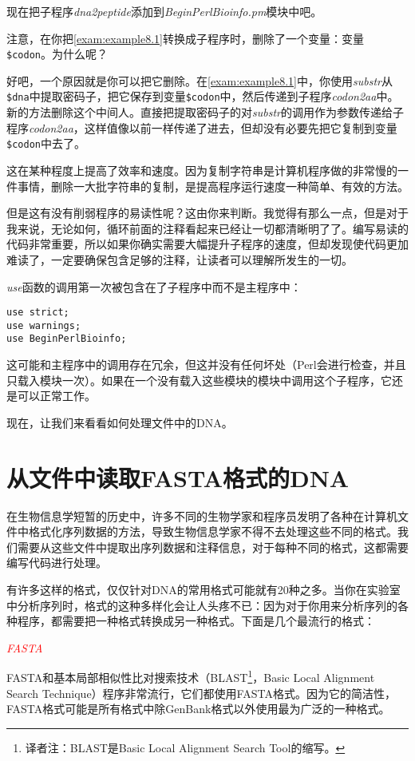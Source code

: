 现在把子程序\textit{dna2peptide}添加到\textit{BeginPerlBioinfo.pm}模块中吧。

注意，在你把\autoref{exam:example8.1}转换成子程序时，删除了一个变量：变量\verb|$codon|。为什么呢？

好吧，一个原因就是你可以把它删除。在\autoref{exam:example8.1}中，你使用\textit{substr}从\verb|$dna|中提取密码子，把它保存到变量\verb|$codon|中，然后传递到子程序\textit{codon2aa}中。新的方法删除这个中间人。直接把提取密码子的对\textit{substr}的调用作为参数传递给子程序\textit{codon2aa}，这样值像以前一样传递了进去，但却没有必要先把它复制到变量\verb|$codon|中去了。

这在某种程度上提高了效率和速度。因为复制字符串是计算机程序做的非常慢的一件事情，删除一大批字符串的复制，是提高程序运行速度一种简单、有效的方法。

但是这有没有削弱程序的易读性呢？这由你来判断。我觉得有那么一点，但是对于我来说，无论如何，循环前面的注释看起来已经让一切都清晰明了了。编写易读的代码非常重要，所以如果你确实需要大幅提升子程序的速度，但却发现使代码更加难读了，一定要确保包含足够的注释，让读者可以理解所发生的一切。

\textit{use}函数的调用第一次被包含在了子程序中而不是主程序中：

\begin{lstlisting}
use strict;
use warnings;
use BeginPerlBioinfo;
\end{lstlisting}

这可能和主程序中的调用存在冗余，但这并没有任何坏处（Perl会进行检查，并且只载入模块一次）。如果在一个没有载入这些模块的模块中调用这个子程序，它还是可以正常工作。

现在，让我们来看看如何处理文件中的DNA。

\section{从文件中读取FASTA格式的DNA}
在生物信息学短暂的历史中，许多不同的生物学家和程序员发明了各种在计算机文件中格式化序列数据的方法，导致生物信息学家不得不去处理这些不同的格式。我们需要从这些文件中提取出序列数据和注释信息，对于每种不同的格式，这都需要编写代码进行处理。

有许多这样的格式，仅仅针对DNA的常用格式可能就有20种之多。当你在实验室中分析序列时，格式的这种多样化会让人头疼不已：因为对于你用来分析序列的各种程序，都需要把一种格式转换成另一种格式。下面是几个最流行的格式：

\textcolor{red}{\textit{FASTA}}
\begin{adjustwidth}{4em}{}
FASTA和基本局部相似性比对搜索技术（BLAST\footnote{译者注：BLAST是Basic Local Alignment Search Tool的缩写。}，Basic Local Alignment Search Technique）程序非常流行，它们都使用FASTA格式。因为它的简洁性，FASTA格式可能是所有格式中除GenBank格式以外使用最为广泛的一种格式。
\end{adjustwidth}

